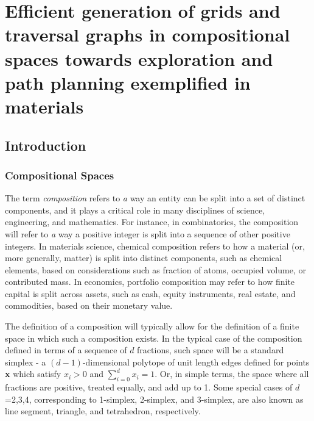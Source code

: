 \chapter{Efficient generation of grids and traversal graphs in compositional spaces towards exploration and path planning exemplified in materials} \label{chap:nimplex}



\section{Introduction} \label{nimplex:sec:introduction}

\subsection{Compositional Spaces} \label{nimplex:ssec:compositionalspaces}

The term \emph{composition} refers to \emph{a} way an entity can be split into a set of distinct components, and it plays a critical role in many disciplines of science, engineering, and mathematics. For instance, in combinatorics, the composition will refer to \emph{a} way a positive integer is split into a sequence of other positive integers. In materials science, chemical composition refers to how a material (or, more generally, matter) is split into distinct components, such as chemical elements, based on considerations such as fraction of atoms, occupied volume, or contributed mass. In economics, portfolio composition may refer to how finite capital is split across assets, such as cash, equity instruments, real estate, and commodities, based on their monetary value.

The definition of a composition will typically allow for the definition of a finite space in which such a composition exists. In the typical case of the composition defined in terms of a sequence of $d$ fractions, such space will be a standard simplex - a $(d-1)$-dimensional polytope of unit length edges defined for points \textbf{x} which satisfy $x_i>0$ and $\sum_{i=0}^d x_i = 1$. Or, in simple terms, the space where all fractions are positive, treated equally, and add up to 1. Some special cases of $d$=2,3,4, corresponding to 1-simplex, 2-simplex, and 3-simplex, are also known as line segment, triangle, and tetrahedron, respectively.

